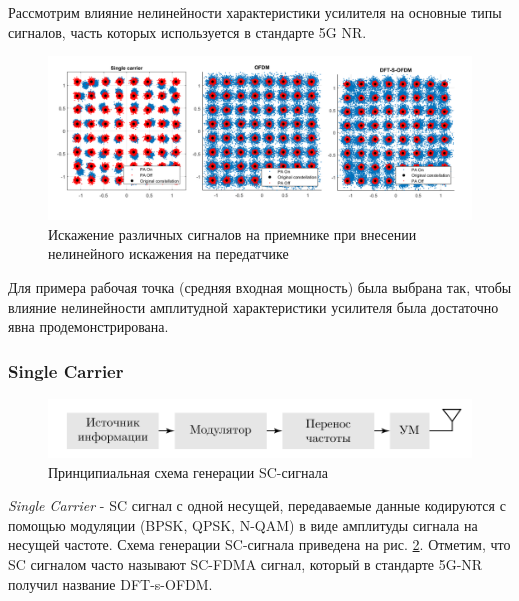 
Рассмотрим влияние нелинейности характеристики усилителя на основные типы
сигналов, часть которых используется в стандарте 5G NR.

\begin{figure}[h!]
    \centering
    \includegraphics[width=0.98\linewidth]{figs/ofdm_pa_distortions.png}
    \caption{Искажение различных сигналов на приемнике при внесении нелинейного
    искажения на передатчике}
    \label{fig:lls_rapp_distortions_0}
\end{figure}

Для примера рабочая точка (средняя входная мощность) была выбрана так,
чтобы влияние нелинейности амплитудной характеристики усилителя была
достаточно явна продемонстрирована.
\subsubsection{Single Carrier}
\begin{figure}[h!]
    \centering
    \includegraphics[scale=1]{figs/sc_scheme.pdf}
    \caption{Принципиальная схема генерации SC-сигнала}
    \label{fig:sc_scheme}
\end{figure}
\textit{Single Carrier} - SC сигнал с одной несущей, передаваемые данные
кодируются с помощью модуляции (BPSK, QPSK, N-QAM) в виде амплитуды сигнала
на несущей частоте. Схема генерации SC-сигнала приведена на рис.
\ref{fig:sc_scheme}. Отметим, что SC сигналом часто называют SC-FDMA
сигнал, который в стандарте 5G-NR получил название DFT-s-OFDM.

